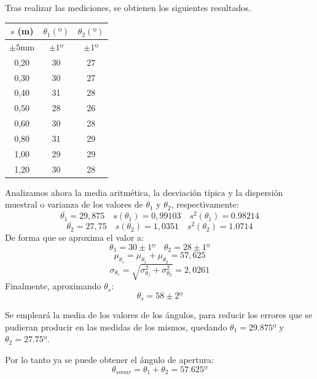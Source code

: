 \documentclass[10pt,a4paper,hidelinks]{article}
\begin{document}
\begin{multicols}{2}
\begin{center}
\end{center}


Tras realizar las mediciones, se obtienen los siguientes resultados.
\begin{center}
\begin{tabular}{ | c | c | c | }
\hline
$s$ (m) & $\theta_1(º)$ & $\theta_2(º)$ \\ \hline
$\pm5$mm & $\pm1º$ & $\pm1º$ \\ \hline \hline
0,20 & 30 & 27 \\ \hline
0,30 & 30 & 27 \\ \hline
0,40 & 31 & 28 \\ \hline
0,50 & 28 & 26 \\ \hline
0,60 & 30 & 28 \\ \hline
0,80 & 31 & 29 \\ \hline
1,00 & 29 & 29 \\ \hline
1,20 & 30 & 28 \\ \hline
\end{tabular}
\end{center}

Analizamos ahora la media aritmética, la desviación típica y la dispersión 
muestral o varianza de los valores de $\theta_1$ y $\theta_2$, respectivamente:
$$ \overline{\theta_1} = 29,875 \quad s(\theta_1) = 0,99103 \quad s^2(\theta_1) 
= 0.98214 $$
$$ \overline{\theta_2} = 27,75 \quad s(\theta_2) = 1,0351 \quad s^2(\theta_2) = 
1.0714 $$
De forma que se aproxima el valor a:
$$ \theta_1 = 30 \pm 1º \quad \theta_2 = 28 \pm 1º $$
$$\mu_{\theta_s} = \mu_{\theta_1} + \mu_{\theta_2} = 57,625 $$
$$\sigma_{\theta_s} = \sqrt{\sigma_{\theta_1}^2 + \sigma_{\theta_2}^2} = 2,0261 
$$
Finalmente, aproximando $\theta_s$:
$$\theta_s = 58 \pm 2º$$


Se empleará la media de los valores de los ángulos, para reducir los errores que
se pudieran producir en las medidas de los mismos, quedando $\theta_1 = 29.875
º$ y $\theta_2 = 27.75 º$.

Por lo tanto ya se puede obtener el ángulo de apertura:
$$\theta_{sonar} = \theta_1 + \theta_2 = 57.625 º $$


\end{multicols}
\end{document}
